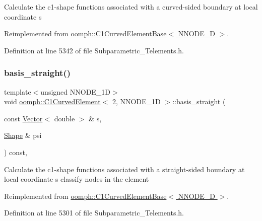 Calculate the c1-\/shape functions associated with a curved-\/sided boundary at local coordinate s 

Reimplemented from \hyperlink{classoomph_1_1C1CurvedElementBase_a9aca3e797997aeb999987b6f69c31320}{oomph\+::\+C1\+Curved\+Element\+Base$<$ N\+N\+O\+D\+E\+\_\+D $>$}.



Definition at line 5342 of file Subparametric\+\_\+\+Telements.\+h.

\mbox{\label{classoomph_1_1C1CurvedElement_3_012_00_01NNODE__1D_01_4_a68d0f04ce0ead20ed00c0925e2ac89db}} 
\subsubsection{\texorpdfstring{basis\+\_\+straight()}{basis\_straight()}}
{\footnotesize\ttfamily template$<$unsigned N\+N\+O\+D\+E\+\_\+1D$>$ \\
void \hyperlink{classoomph_1_1C1CurvedElement}{oomph\+::\+C1\+Curved\+Element}$<$ 2, N\+N\+O\+D\+E\+\_\+1D $>$\+::basis\+\_\+straight (\begin{DoxyParamCaption}\item[{const \hyperlink{classoomph_1_1Vector}{Vector}$<$ double $>$ \&}]{s,  }\item[{\hyperlink{classoomph_1_1Shape}{Shape} \&}]{psi }\end{DoxyParamCaption}) const\hspace{0.3cm}{\ttfamily [inline]}, {\ttfamily [virtual]}}

Calculate the c1-\/shape functions associated with a straight-\/sided boundary at local coordinate s classify nodes in the element 

Reimplemented from \hyperlink{classoomph_1_1C1CurvedElementBase_a256c9d25d9f4c9067914b39d1cc4c6fa}{oomph\+::\+C1\+Curved\+Element\+Base$<$ N\+N\+O\+D\+E\+\_\+D $>$}.



Definition at line 5301 of file Subparametric\+\_\+\+Telements.\+h.

\mbox{\label{classoomph_1_1C1CurvedElement_3_012_00_01NNODE__1D_01_4_abbf443d8eed21f53dc7d4734d19859d7}} 
